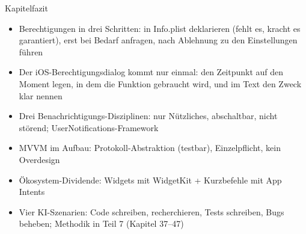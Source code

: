 \begin{tcbsummary}{Kapitelfazit}
\begin{itemize}
  \item Berechtigungen in drei Schritten: in Info.plist deklarieren (fehlt es, kracht es garantiert), erst bei Bedarf anfragen, nach Ablehnung zu den Einstellungen führen
  \item Der iOS-Berechtigungsdialog kommt nur einmal: den Zeitpunkt auf den Moment legen, in dem die Funktion gebraucht wird, und im Text den Zweck klar nennen
  \item Drei Benachrichtigungs-Disziplinen: nur Nützliches, abschaltbar, nicht störend; UserNotifications-Framework
  \item MVVM im Aufbau: Protokoll-Abstraktion (testbar), Einzelpflicht, kein Overdesign
  \item Ökosystem-Dividende: Widgets mit WidgetKit + Kurzbefehle mit App Intents
  \item Vier KI-Szenarien: Code schreiben, recherchieren, Tests schreiben, Bugs beheben; Methodik in Teil 7 (Kapitel 37–47)
\end{itemize}

\end{tcbsummary}
